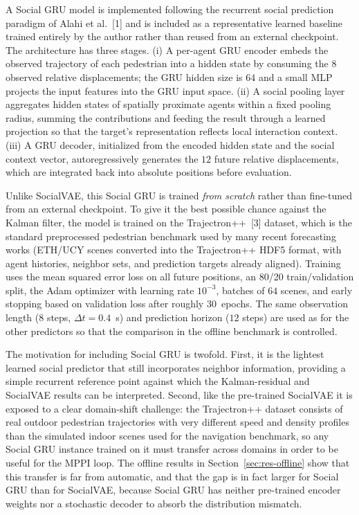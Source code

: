 \documentclass[12pt, a4paper]{article}
\begin{document}
A Social GRU model is implemented following the recurrent social prediction paradigm of Alahi et al.~[1] and is included as a representative learned baseline trained entirely by the author rather than reused from an external checkpoint. The architecture has three stages. (i) A per-agent GRU encoder embeds the observed trajectory of each pedestrian into a hidden state by consuming the $8$ observed relative displacements; the GRU hidden size is $64$ and a small MLP projects the input features into the GRU input space. (ii) A social pooling layer aggregates hidden states of spatially proximate agents within a fixed pooling radius, summing the contributions and feeding the result through a learned projection so that the target's representation reflects local interaction context. (iii) A GRU decoder, initialized from the encoded hidden state and the social context vector, autoregressively generates the $12$ future relative displacements, which are integrated back into absolute positions before evaluation.

Unlike SocialVAE, this Social GRU is trained \emph{from scratch} rather than fine-tuned from an external checkpoint. To give it the best possible chance against the Kalman filter, the model is trained on the Trajectron++~[3] dataset, which is the standard preprocessed pedestrian benchmark used by many recent forecasting works (ETH/UCY scenes converted into the Trajectron++ HDF5 format, with agent histories, neighbor sets, and prediction targets already aligned). Training uses the mean squared error loss on all future positions, an 80/20 train/validation split, the Adam optimizer with learning rate $10^{-3}$, batches of $64$ scenes, and early stopping based on validation loss after roughly $30$~epochs. The same observation length ($8$ steps, $\Delta t = 0.4$~s) and prediction horizon ($12$ steps) are used as for the other predictors so that the comparison in the offline benchmark is controlled.

The motivation for including Social GRU is twofold. First, it is the lightest learned social predictor that still incorporates neighbor information, providing a simple recurrent reference point against which the Kalman-residual and SocialVAE results can be interpreted. Second, like the pre-trained SocialVAE it is exposed to a clear domain-shift challenge: the Trajectron++ dataset consists of real outdoor pedestrian trajectories with very different speed and density profiles than the simulated indoor scenes used for the navigation benchmark, so any Social GRU instance trained on it must transfer across domains in order to be useful for the MPPI loop. The offline results in Section~\ref{sec:res-offline} show that this transfer is far from automatic, and that the gap is in fact larger for Social GRU than for SocialVAE, because Social GRU has neither pre-trained encoder weights nor a stochastic decoder to absorb the distribution mismatch.
\end{document}
